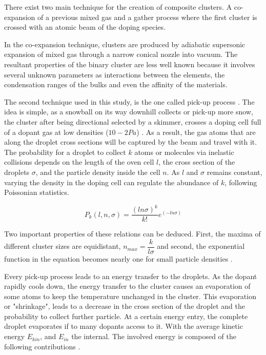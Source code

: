 There exist two main technique for the creation of composite clusters. A co-expansion of a previous mixed gas \cite{tchaplyguine_variable_2004} and a gather process where the first cluster is crossed with an atomic beam of the doping species.

In the co-expansion technique, clusters are produced by adiabatic supersonic expansion of mixed gas through a narrow conical nozzle into vacuum\cite{tchaplyguine_variable_2004}. The resultant properties of the binary cluster are less well known because it involves several unknown parameters as interactions between the elements, the condensation ranges of the bulks and even the affinity of the materials\cite{reinhard_introduction_2004}.

The second technique used in this study, is the one called pick-up process \cite{gough_infrared_1985}. The idea is simple, as a snowball on its way downhill collects or pick-up more snow, the cluster after being directional selected by a skimmer, crosses a doping cell full of a dopant gas at low densities ($10-2 Pa$) \cite{stienkemeier_spectroscopy_2006}. As a result, the gas atoms that are along the droplet cross sections will be captured by the beam and travel with it. The probability for a droplet to collect $k$ atoms or molecules via inelastic collisions depends on the length of the oven cell $l$, the cross section of the droplets $\sigma $, and the particle density inside the cell $n$. As $l$ and $\sigma $ remains constant, varying the density in the doping cell can regulate the abundance of $k$, following Poissonian statistics.

\begin{equation}
P_{k}(l,n,\sigma)=\dfrac{(ln\sigma)^{k}}{k!} e^{(-ln\sigma)}
\end{equation}

Two important properties of these relations can be deduced. First, the maxima of different cluster sizes  are equidistant, $n_{max}=\dfrac{k}{l\sigma}$ and second, the exponential function in the equation  becomes  nearly  one for  small  particle  densities \cite{bunermann_modeling_2011}.

Every pick-up process leads to an energy transfer to the droplets. As the dopant rapidly cools down, the energy transfer to the cluster causes an evaporation of some atoms to keep the temperature unchanged in the cluster. This evaporation or "shrinkage", leads to a decrease in the cross section of the droplet and the probability to collect further particle. At a certain energy entry, the complete droplet evaporates if to many dopants access to it. With the average kinetic energy $E_{kin}$, and $E_{in}$ the internal.  The involved energy is composed of the following contributions \cite{bunermann_modeling_2011}.

